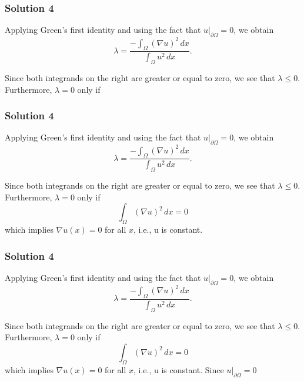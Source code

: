 \documentclass[10pt, t, allowdisplaybreaks]{beamer}
\newcommand{\at}[3]{\left.#1\right\vert_{#2}^{#3}}
\begin{document}
\begin{frame}
    \frametitle{Solution 4}
    \par Applying Green's first identity and using the fact that $\at{u}{\partial \Omega}{} = 0$, we obtain
    \begin{equation*}
        \lambda = \frac{-\int_\Omega (\nabla u)^2\,dx}{\int_\Omega u^2\,dx}.
    \end{equation*}

    \par Since both integrands on the right are greater or equal to zero, we see that $\lambda\leq 0$. Furthermore, $\lambda = 0$ only if 
\end{frame}
\begin{frame}
    \frametitle{Solution 4}
    \par Applying Green's first identity and using the fact that $\at{u}{\partial \Omega}{} = 0$, we obtain
    \begin{equation*}
        \lambda = \frac{-\int_\Omega (\nabla u)^2\,dx}{\int_\Omega u^2\,dx}.
    \end{equation*}

    \par Since both integrands on the right are greater or equal to zero, we see that $\lambda\leq 0$. Furthermore, $\lambda = 0$ only if 
    \begin{equation*}
        \int_\Omega(\nabla u)^2\,dx = 0
    \end{equation*}
    which implies $\nabla u(x) = 0$ for all $x$, i.e., u is constant.
\end{frame}
\begin{frame}
    \frametitle{Solution 4}
    \par Applying Green's first identity and using the fact that $\at{u}{\partial \Omega}{} = 0$, we obtain
    \begin{equation*}
        \lambda = \frac{-\int_\Omega (\nabla u)^2\,dx}{\int_\Omega u^2\,dx}.
    \end{equation*}

    \par Since both integrands on the right are greater or equal to zero, we see that $\lambda\leq 0$. Furthermore, $\lambda = 0$ only if 
    \begin{equation*}
        \int_\Omega(\nabla u)^2\,dx = 0
    \end{equation*}
    which implies $\nabla u(x) = 0$ for all $x$, i.e., u is constant. Since $\at{u}{\partial \Omega}{} = 0$
\end{frame}
\end{document}
